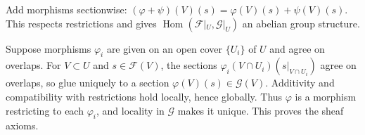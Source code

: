 Add morphisms sectionwise: $(\varphi+\psi)(V)(s)=\varphi(V)(s)+\psi(V)(s)$. This respects restrictions and gives $\operatorname{Hom}(\mathscr F|_U,\mathscr G|_U)$ an abelian group structure.

Suppose morphisms $\varphi_i$ are given on an open cover $\{U_i\}$ of $U$ and agree on overlaps. For $V\subset U$ and $s\in\mathscr F(V)$, the sections $\varphi_i(V\cap U_i)(s|_{V\cap U_i})$ agree on overlaps, so glue uniquely to a section $\varphi(V)(s)\in\mathscr G(V)$. Additivity and compatibility with restrictions hold locally, hence globally. Thus $\varphi$ is a morphism restricting to each $\varphi_i$, and locality in $\mathscr G$ makes it unique. This proves the sheaf axioms.
